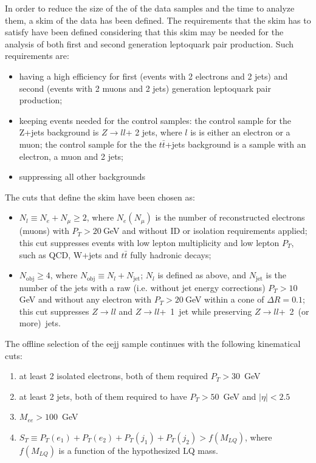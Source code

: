 In order to reduce the size of the of the data samples and the time to analyze them, a skim of the 
data has been defined.
The requirements that the skim has to satisfy have been defined considering that this skim may be needed
for the analysis of both first and second generation leptoquark pair production. Such requirements are:
\begin{itemize}
\item having a high efficiency for first (events with 2 electrons and 2 jets) and second (events with 
2 muons and 2 jets) generation leptoquark pair production; 
\item keeping events needed for the control samples: the control sample for the Z+jets background is $Z\rightarrow l l$+ 2 jets,
where $l$ is is either an electron or a muon; the control sample for the the $t\bar{t}$+jets background is a sample 
with an electron, a muon and 2 jets;
\item suppressing all other backgrounds
\end{itemize}
The cuts that define the skim have been chosen as:
\begin{itemize}
\item $N_l \equiv N_e + N_{\mu} \ge 2$, where $N_e (N_{\mu})$ is the number of reconstructed electrons (muons)
with $P_T>20~$GeV and without ID or isolation requirements applied; this cut suppresses events with low 
lepton multiplicity and low lepton $P_T$, such as QCD, W+jets and $t\bar{t}$ fully hadronic decays;
\item $N_{\mathrm{obj}} \ge 4$, where $N_{\mathrm{obj}} \equiv N_l + N_{\mathrm{jet}}$; $N_l$ is defined as above, and
$N_{\mathrm{jet}}$ is the number of the jets with a raw (i.e. without jet energy corrections) $P_T > 10~$GeV and without 
any electron with $P_T > 20~$GeV within a cone of $\Delta R=0.1$; this cut suppresses $Z \rightarrow ll$ and 
$Z \rightarrow ll$+~1~jet while preserving $Z \rightarrow ll$+~2~(or more)~jets.
\end{itemize}

The offline selection of the eejj sample continues with the following kinematical cuts:
%
\begin{enumerate}
\item at least 2 isolated electrons, both of them required $P_T>30$~GeV 
\item at least 2 jets, both of them required to have $P_T>50$~GeV and $|\eta|<2.5$
\item $M_{ee}>100$~GeV
\item $S_T\equiv P_T(e_1)+P_T(e_2)+P_T(j_1)+P_T(j_2)>f(M_{LQ})$, where $f(M_{LQ})$ is a function 
of the hypothesized LQ mass.
\end{enumerate}
%


